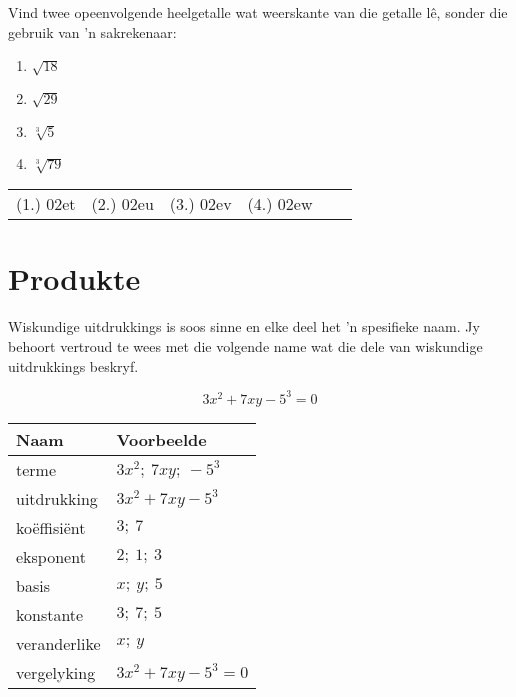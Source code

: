 \begin{exercises}{}
 {
Vind twee opeenvolgende heelgetalle wat weerskante van die getalle lê, sonder die gebruik van 'n sakrekenaar:
\begin{enumerate}[itemsep=5pt, label=\textbf{\arabic*}. ]
\item $\sqrt{18}$
\item $\sqrt{29}$
\item $\sqrt[3]{5}$
\item $\sqrt[3]{79}$

\end{enumerate}
\par \practiceinfo
\par \begin{tabular}[h]{cccccc}
(1.)	02et	&
(2.)	02eu	&
(3.)	02ev	&
(4.)	02ew	&
\end{tabular}
}
\end{exercises}



\section{Produkte}
\setcounter{figure}{1}
\setcounter{subfigure}{1}

%   
\nopagebreak
Wiskundige uitdrukkings is soos sinne en elke deel het ’n spesifieke naam. Jy behoort vertroud te wees met die volgende name wat die dele van wiskundige uitdrukkings beskryf.\par 

\begin{equation*}
3x^2 + 7xy -5^3 = 0
\end{equation*}


\begin{table}[H]
\begin{center}
\begin{tabular}{|l|l|}
\hline
\textbf{Naam} & \textbf{Voorbeelde} \\
\hline
terme & $3x^2;~7xy;~-5^3$\\ \hline
uitdrukking & $3x^2 + 7xy -5^3$\\ \hline
koëffisiënt & $3;~7$\\ \hline
eksponent & $2;~1;~3$\\ \hline
basis & $x;~y;~5$\\ \hline
konstante & $3;~7;~5$\\ \hline
veranderlike & $x;~y$\\ \hline
vergelyking & $3x^2 + 7xy -5^3 = 0$\\ \hline


\end{tabular}
\end{center}
\end{table} 

